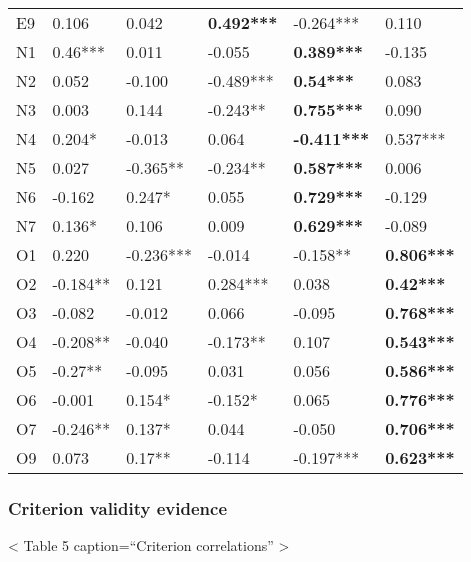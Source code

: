 \documentclass[,man,floatsintext]{apa6}
\theoremstyle{definition}
\theoremstyle{definition}
\theoremstyle{definition}
\theoremstyle{remark}
\begin{document}
\begin{table}[ht]
\begin{tabular}{llllll}
  E9 & 0.106 & 0.042 & \textbf{0.492***} & -0.264*** & 0.110 \\ 
  N1 & 0.46*** & 0.011 & -0.055 & \textbf{0.389***} & -0.135 \\ 
  N2 & 0.052 & -0.100 & -0.489*** & \textbf{0.54***} & 0.083 \\ 
  N3 & 0.003 & 0.144 & -0.243** & \textbf{0.755***} & 0.090 \\ 
  N4 & 0.204* & -0.013 & 0.064 & \textbf{-0.411***} & 0.537*** \\ 
  N5 & 0.027 & -0.365** & -0.234** & \textbf{0.587***} & 0.006 \\ 
  N6 & -0.162 & 0.247* & 0.055 & \textbf{0.729***} & -0.129 \\ 
  N7 & 0.136* & 0.106 & 0.009 & \textbf{0.629***} & -0.089 \\ 
  O1 & 0.220 & -0.236*** & -0.014 & -0.158** & \textbf{0.806***} \\ 
  O2 & -0.184** & 0.121 & 0.284*** & 0.038 & \textbf{0.42***} \\ 
  O3 & -0.082 & -0.012 & 0.066 & -0.095 & \textbf{0.768***} \\ 
  O4 & -0.208** & -0.040 & -0.173** & 0.107 & \textbf{0.543***} \\ 
  O5 & -0.27** & -0.095 & 0.031 & 0.056 & \textbf{0.586***} \\ 
  O6 & -0.001 & 0.154* & -0.152* & 0.065 & \textbf{0.776***} \\ 
  O7 & -0.246** & 0.137* & 0.044 & -0.050 & \textbf{0.706***} \\ 
  O9 & 0.073 & 0.17** & -0.114 & -0.197*** & \textbf{0.623***} \\ 
   \hline
\end{tabular}
\endgroup
\end{table}

\hypertarget{criterion-validity-evidence-1}{%
\subsubsection{Criterion validity
evidence}\label{criterion-validity-evidence-1}}

\textless{} Table 5 caption=\enquote{Criterion correlations}
\textgreater{}
\end{document}
